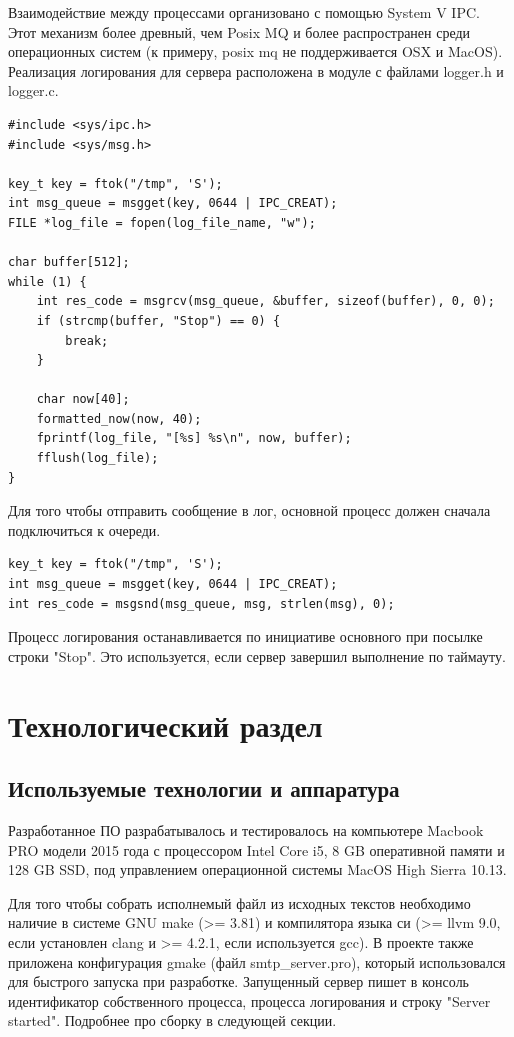 \documentclass[a4paper,12pt]{report}
\begin{document}
Взаимодействие между процессами организовано с помощью System V IPC. Этот механизм более древный, чем Posix MQ и более распространен среди операционных систем (к примеру, posix mq не поддерживается OSX и MacOS). Реализация логирования для сервера расположена в модуле с файлами logger.h и logger.c.

\begin{verbatim}
#include <sys/ipc.h>
#include <sys/msg.h>

key_t key = ftok("/tmp", 'S');
int msg_queue = msgget(key, 0644 | IPC_CREAT);
FILE *log_file = fopen(log_file_name, "w");

char buffer[512];
while (1) {
    int res_code = msgrcv(msg_queue, &buffer, sizeof(buffer), 0, 0);
    if (strcmp(buffer, "Stop") == 0) {
        break;
    }

    char now[40];
    formatted_now(now, 40);
    fprintf(log_file, "[%s] %s\n", now, buffer);
    fflush(log_file);
}
\end{verbatim}

Для того чтобы отправить сообщение в лог, основной процесс должен сначала подключиться к очереди.
\begin{verbatim}
key_t key = ftok("/tmp", 'S');
int msg_queue = msgget(key, 0644 | IPC_CREAT);
int res_code = msgsnd(msg_queue, msg, strlen(msg), 0);
\end{verbatim}

Процесс логирования останавливается по инициативе основного при посылке строки "Stop". Это используется, если сервер завершил выполнение по таймауту.


\chapter{Технологический раздел}


\section{Используемые технологии и аппаратура}

Разработанное ПО разрабатывалось и тестировалось на компьютере Macbook PRO модели 2015 года с процессором Intel Core i5, 8 GB оперативной памяти и 128 GB SSD, под управлением операционной системы MacOS High Sierra 10.13.

Для того чтобы собрать исполнемый файл из исходных текстов необходимо наличие в системе GNU make (>= 3.81) и компилятора языка си (>= llvm 9.0, если установлен clang и >= 4.2.1, если используется gcc). В проекте также приложена конфигурация gmake (файл smtp\_server.pro), который использовался для быстрого запуска при разработке. Запущенный сервер пишет в консоль идентификатор собственного процесса, процесса логирования и строку "Server started". Подробнее про сборку в следующей секции.
\end{document}
